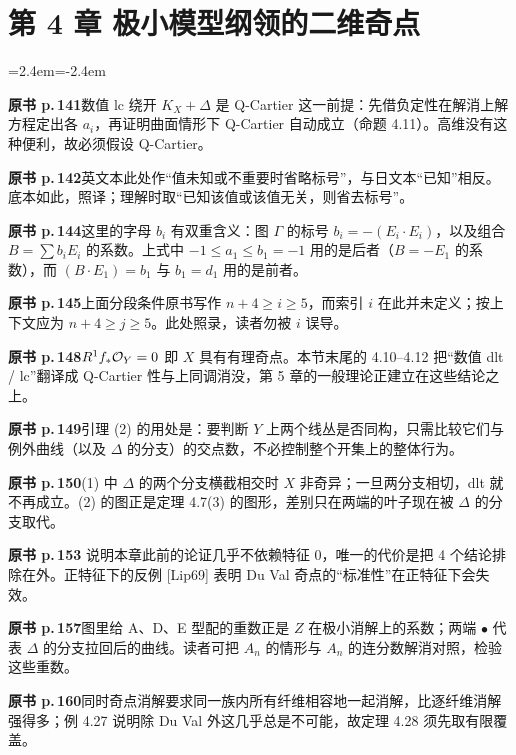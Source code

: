 \section*{第 4 章 极小模型纲领的二维奇点}
\begin{list}{}{\leftmargin=2.4em\itemindent=-2.4em\itemsep=2pt\parsep=0pt}
\item \textbf{原书 p.\,141}\quad 数值 lc 绕开 $K_X+\Delta$ 是 Q-Cartier 这一前提：先借负定性在解消上解方程定出各 $a_i$，再证明曲面情形下 Q-Cartier 自动成立（命题 4.11）。高维没有这种便利，故必须假设 Q-Cartier。
\item \textbf{原书 p.\,142}\quad 英文本此处作“值未知或不重要时省略标号”，与日文本“已知”相反。底本如此，照译；理解时取“已知该值或该值无关，则省去标号”。
\item \textbf{原书 p.\,144}\quad 这里的字母 $b_i$ 有双重含义：图 $\Gamma$ 的标号 $b_i=-(E_i\cdot E_i)$，以及组合 $B=\sum b_iE_i$ 的系数。上式中 $-1\le a_1\le b_1=-1$ 用的是后者（$B=-E_1$ 的系数），而 $(B\cdot E_1)=b_1$ 与 $b_1=d_1$ 用的是前者。
\item \textbf{原书 p.\,145}\quad 上面分段条件原书写作 $n+4\ge i\ge 5$，而索引 $i$ 在此并未定义；按上下文应为 $n+4\ge j\ge 5$。此处照录，读者勿被 $i$ 误导。
\item \textbf{原书 p.\,148}\quad $R^1f_*\mathcal{O}_Y=0$ 即 $X$ 具有有理奇点。本节末尾的 4.10–4.12 把“数值 dlt / lc”翻译成 Q-Cartier 性与上同调消没，第 5 章的一般理论正建立在这些结论之上。
\item \textbf{原书 p.\,149}\quad 引理 (2) 的用处是：要判断 $Y$ 上两个线丛是否同构，只需比较它们与例外曲线（以及 $\Delta$ 的分支）的交点数，不必控制整个开集上的整体行为。
\item \textbf{原书 p.\,150}\quad (1) 中 $\Delta$ 的两个分支横截相交时 $X$ 非奇异；一旦两分支相切，dlt 就不再成立。(2) 的图正是定理 4.7(3) 的图形，差别只在两端的叶子现在被 $\Delta$ 的分支取代。
\item \textbf{原书 p.\,153} 说明本章此前的论证几乎不依赖特征 0，唯一的代价是把 4 个结论排除在外。正特征下的反例 [Lip69] 表明 Du Val 奇点的“标准性”在正特征下会失效。
\item \textbf{原书 p.\,157}\quad 图里给 A、D、E 型配的重数正是 $Z$ 在极小消解上的系数；两端 $\bullet$ 代表 $\Delta$ 的分支拉回后的曲线。读者可把 $A_n$ 的情形与 $A_n$ 的连分数解消对照，检验这些重数。
\item \textbf{原书 p.\,160}\quad 同时奇点消解要求同一族内所有纤维相容地一起消解，比逐纤维消解强得多；例 4.27 说明除 Du Val 外这几乎总是不可能，故定理 4.28 须先取有限覆盖。

\end{list}
